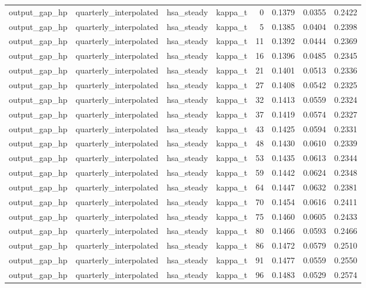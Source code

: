 \begin{tabular}{llllrrrr}
output\_gap\_hp & quarterly\_interpolated & hsa\_steady & kappa\_t & 0 & 0.1379 & 0.0355 & 0.2422 \\
output\_gap\_hp & quarterly\_interpolated & hsa\_steady & kappa\_t & 5 & 0.1385 & 0.0404 & 0.2398 \\
output\_gap\_hp & quarterly\_interpolated & hsa\_steady & kappa\_t & 11 & 0.1392 & 0.0444 & 0.2369 \\
output\_gap\_hp & quarterly\_interpolated & hsa\_steady & kappa\_t & 16 & 0.1396 & 0.0485 & 0.2345 \\
output\_gap\_hp & quarterly\_interpolated & hsa\_steady & kappa\_t & 21 & 0.1401 & 0.0513 & 0.2336 \\
output\_gap\_hp & quarterly\_interpolated & hsa\_steady & kappa\_t & 27 & 0.1408 & 0.0542 & 0.2325 \\
output\_gap\_hp & quarterly\_interpolated & hsa\_steady & kappa\_t & 32 & 0.1413 & 0.0559 & 0.2324 \\
output\_gap\_hp & quarterly\_interpolated & hsa\_steady & kappa\_t & 37 & 0.1419 & 0.0574 & 0.2327 \\
output\_gap\_hp & quarterly\_interpolated & hsa\_steady & kappa\_t & 43 & 0.1425 & 0.0594 & 0.2331 \\
output\_gap\_hp & quarterly\_interpolated & hsa\_steady & kappa\_t & 48 & 0.1430 & 0.0610 & 0.2339 \\
output\_gap\_hp & quarterly\_interpolated & hsa\_steady & kappa\_t & 53 & 0.1435 & 0.0613 & 0.2344 \\
output\_gap\_hp & quarterly\_interpolated & hsa\_steady & kappa\_t & 59 & 0.1442 & 0.0624 & 0.2348 \\
output\_gap\_hp & quarterly\_interpolated & hsa\_steady & kappa\_t & 64 & 0.1447 & 0.0632 & 0.2381 \\
output\_gap\_hp & quarterly\_interpolated & hsa\_steady & kappa\_t & 70 & 0.1454 & 0.0616 & 0.2411 \\
output\_gap\_hp & quarterly\_interpolated & hsa\_steady & kappa\_t & 75 & 0.1460 & 0.0605 & 0.2433 \\
output\_gap\_hp & quarterly\_interpolated & hsa\_steady & kappa\_t & 80 & 0.1466 & 0.0593 & 0.2466 \\
output\_gap\_hp & quarterly\_interpolated & hsa\_steady & kappa\_t & 86 & 0.1472 & 0.0579 & 0.2510 \\
output\_gap\_hp & quarterly\_interpolated & hsa\_steady & kappa\_t & 91 & 0.1477 & 0.0559 & 0.2550 \\
output\_gap\_hp & quarterly\_interpolated & hsa\_steady & kappa\_t & 96 & 0.1483 & 0.0529 & 0.2574 \\

\end{tabular}
